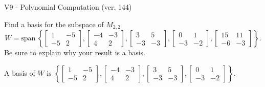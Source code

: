 \begin{exercise}
  \begin{exerciseTitle}V9 - Polynomial Computation (ver. 144)\end{exerciseTitle}
  \begin{exerciseStatement}
    Find a basis for the subspace of \(M_{2,2}\) 
\[W=\mathrm{span}\ \left\{\left[\begin{array}{cc}
1 & -5 \\
-5 & 2
\end{array}\right] , \left[\begin{array}{cc}
-4 & -3 \\
4 & 2
\end{array}\right] , \left[\begin{array}{cc}
3 & 5 \\
-3 & -3
\end{array}\right] , \left[\begin{array}{cc}
0 & 1 \\
-3 & -2
\end{array}\right] , \left[\begin{array}{cc}
15 & 11 \\
-6 & -3
\end{array}\right]\right\}.\]
 Be sure to explain why your result is a basis.


  \end{exerciseStatement}
  \begin{exerciseAnswer}
   A basis of \(W\) is  \(\left\{\left[\begin{array}{cc}
1 & -5 \\
-5 & 2
\end{array}\right] , \left[\begin{array}{cc}
-4 & -3 \\
4 & 2
\end{array}\right] , \left[\begin{array}{cc}
3 & 5 \\
-3 & -3
\end{array}\right] , \left[\begin{array}{cc}
0 & 1 \\
-3 & -2
\end{array}\right]\right\}\).
  


  \end{exerciseAnswer}
\end{exercise}